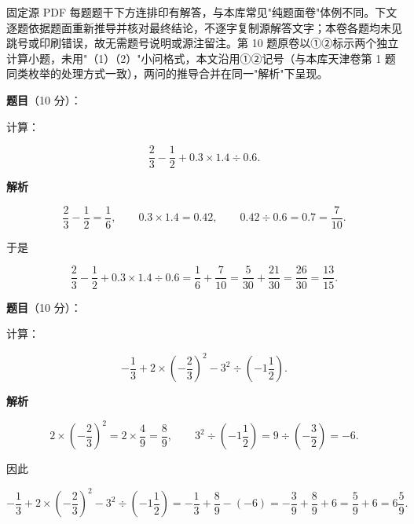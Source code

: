 

\begin{gktip}
固定源 PDF 每题题干下方连排印有解答，与本库常见"纯题面卷"体例不同。下文逐题依据题面重新推导并核对最终结论，不逐字复制源解答文字；本卷各题均未见跳号或印刷错误，故无需题号说明或源注留注。第 10 题原卷以①②标示两个独立计算小题，未用"（1）（2）"小问格式，本文沿用①②记号（与本库天津卷第 1 题同类枚举的处理方式一致），两问的推导合并在同一"解析"下呈现。
\end{gktip}

\begin{answer}

\textbf{题目}（10 分）：

计算：

\nopagebreak[4]
\[
\frac23-\frac12+0.3\times1.4\div0.6.
\]

\textbf{解析}

\nopagebreak[4]
\[
\frac23-\frac12=\frac16,
\qquad 0.3\times1.4=0.42,
\qquad 0.42\div0.6=0.7=\frac{7}{10}.
\]

于是

\nopagebreak[4]
\[
\frac23-\frac12+0.3\times1.4\div0.6
=\frac16+\frac{7}{10}
=\frac{5}{30}+\frac{21}{30}=\frac{26}{30}=\frac{13}{15}.
\]


\end{answer}
\begin{answer}

\textbf{题目}（10 分）：

计算：

\nopagebreak[4]
\[
-\frac13+2\times\left(-\frac23\right)^2-3^2\div\left(-1\frac12\right).
\]

\textbf{解析}

\nopagebreak[4]
\[
2\times\left(-\frac23\right)^2=2\times\frac49=\frac89,
\qquad
3^2\div\left(-1\frac12\right)=9\div\left(-\frac32\right)=-6.
\]

因此

\nopagebreak[4]
\[
-\frac13+2\times\left(-\frac23\right)^2-3^2\div\left(-1\frac12\right)
=-\frac13+\frac89-(-6)
=-\frac39+\frac89+6=\frac59+6=6\frac59.
\]


\end{answer}
